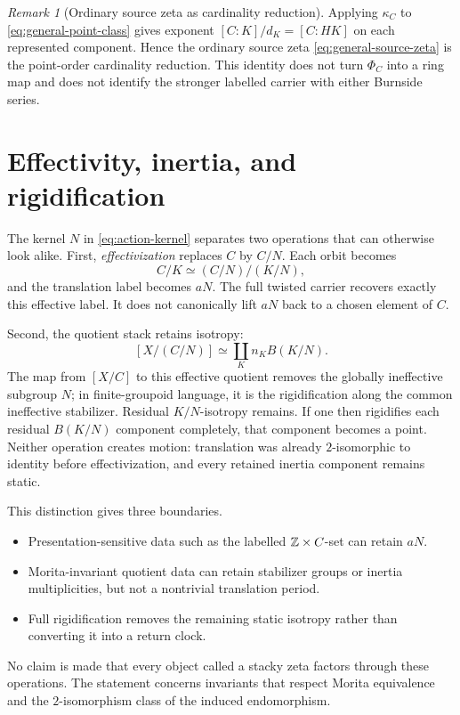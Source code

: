 \documentclass[11pt]{article}
\theoremstyle{definition}
\theoremstyle{remark}
\newtheorem{remark}[theorem]{Remark}
\begin{document}
\begin{remark}[Ordinary source zeta as cardinality reduction]
Applying \(\kappa_C\) to \eqref{eq:general-point-class} gives exponent
\([C:K]/d_K=[C:HK]\) on each represented component.  Hence the ordinary
source zeta \eqref{eq:general-source-zeta} is the point-order cardinality
reduction.  This identity does not turn \(\Phi_C\) into a ring map and does
not identify the stronger labelled carrier with either Burnside series.
\end{remark}

\section{Effectivity, inertia, and rigidification}
\label{sec:groupoid}

The kernel \(N\) in \eqref{eq:action-kernel} separates two operations that
can otherwise look alike.  First, \emph{effectivization} replaces \(C\) by
\(C/N\).  Each orbit becomes
\begin{equation}
  C/K\simeq (C/N)/(K/N),
  \label{eq:effectivized-orbit}
\end{equation}
and the translation label becomes \(aN\).  The full twisted carrier recovers
exactly this effective label.  It does not canonically lift \(aN\) back to a
chosen element of \(C\).

Second, the quotient stack retains isotropy:
\[
  [X/(C/N)]\simeq\coprod_Kn_KB(K/N).
\]
The map from \([X/C]\) to this effective quotient removes the globally
ineffective subgroup \(N\); in finite-groupoid language, it is the
rigidification along the common ineffective stabilizer.  Residual
\(K/N\)-isotropy remains.  If one then rigidifies each residual \(B(K/N)\)
component completely, that component becomes a point.  Neither operation
creates motion: translation was already \(2\)-isomorphic to identity before
effectivization, and every retained inertia component remains static.

This distinction gives three boundaries.
\begin{itemize}
  \item Presentation-sensitive data such as the labelled
        \(\mathbb{Z}\times C\)-set can retain \(aN\).
  \item Morita-invariant quotient data can retain stabilizer groups or
        inertia multiplicities, but not a nontrivial translation period.
  \item Full rigidification removes the remaining static isotropy rather
        than converting it into a return clock.
\end{itemize}
No claim is made that every object called a stacky zeta factors through these
operations.  The statement concerns invariants that respect Morita
equivalence and the \(2\)-isomorphism class of the induced endomorphism.
\end{document}
